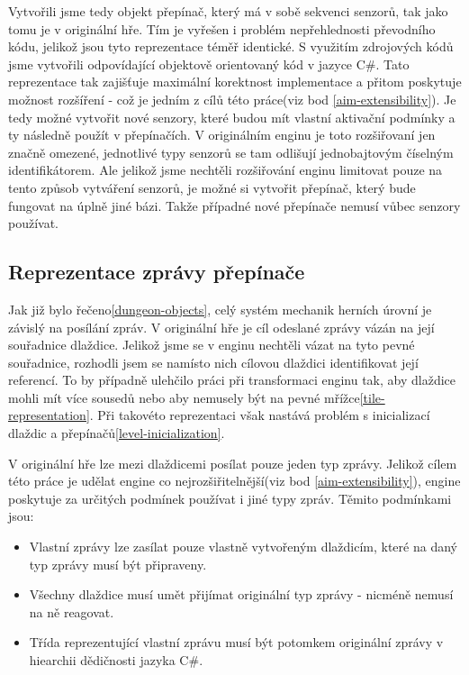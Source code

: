 Vytvořili jsme tedy objekt přepínač, který má v sobě sekvenci senzorů, tak jako tomu je v originální hře.
Tím je vyřešen i problém nepřehlednosti převodního kódu, jelikož jsou tyto reprezentace téměř identické.
S využitím zdrojových kódů jsme vytvořili odpovídající objektově orientovaný kód v jazyce C\#. Tato reprezentace
tak zajišťuje maximální korektnost implementace a přitom poskytuje možnost rozšíření - což je jedním z cílů této práce(viz bod \ref{aim-extensibility}). 
Je tedy možné vytvořit nové senzory, které budou mít vlastní aktivační podmínky a ty následně použít v přepínačích.
V originálním enginu je toto rozšiřovaní jen značně omezené, jednotlivé typy senzorů se tam odlišují jednobajtovým číselným identifikátorem.
Ale jelikož jsme nechtěli rozšiřování enginu limitovat pouze na tento způsob vytváření senzorů, je možné si vytvořit přepínač, který
bude fungovat na úplně jiné bázi. Takže případné nové přepínače nemusí vůbec senzory používat. 

\subsection{Reprezentace zprávy přepínače}\label{actuator-message-representation}

Jak již bylo řečeno\vref{dungeon-objects}, celý systém mechanik herních úrovní je závislý na posílání zpráv. 
V originální hře je cíl odeslané zprávy vázán na její souřadnice dlaždice. 
Jelikož jsme se v enginu nechtěli vázat na tyto pevné souřadnice, rozhodli jsem se namísto nich
cílovou dlaždici identifikovat její referencí. To by případně ulehčilo práci při transformaci enginu tak, aby
dlaždice mohli mít více sousedů nebo aby nemusely být na pevné mřížce\vref{tile-representation}.
Při takovéto reprezentaci však nastává problém s inicializací dlaždic a přepínačů\vref{level-inicialization}.

V originální hře lze mezi dlaždicemi posílat pouze jeden typ zprávy. Jelikož cílem této práce je udělat engine
co nejrozšiřitelnější(viz bod \ref{aim-extensibility}), engine poskytuje za určitých podmínek používat i jiné typy zpráv.
Těmito podmínkami jsou:
\begin{itemize}
\item Vlastní zprávy lze zasílat pouze vlastně vytvořeným dlaždicím, které na daný typ zprávy musí být připraveny.
\item Všechny dlaždice musí umět přijímat originální typ zprávy - nicméně nemusí na ně reagovat.
\item Třída reprezentující vlastní zprávu musí být potomkem originální zprávy v hiearchii dědičnosti jazyka C\#.
\end{itemize}

